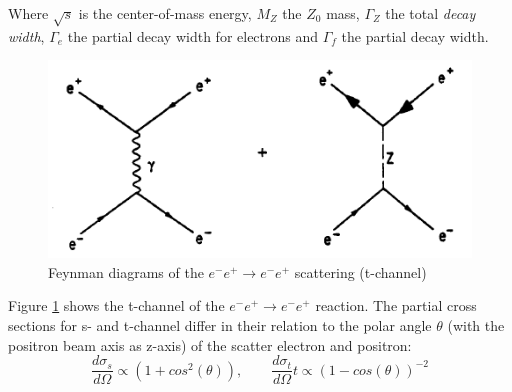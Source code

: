 Where $\sqrt{s}$ is the center-of-mass energy, $M_Z$ the $Z_0$ mass, $\Gamma_Z$ the total \emph{decay width}, $\Gamma_e$ the partial decay width for electrons and $\Gamma_f$ the partial decay width.
\begin{figure}[H]
	\centering
	\includegraphics{graphics/BhabbaStreuung.png}
	\caption[Feynman diagram: Bhabha scattering]{Feynman diagrams of the $e^-e^+ \rightarrow e^-e^+$ scattering (t-channel)\cite{muenchen}}
	\label{fig:principles:BhabbaStreuung.png}
\end{figure}
Figure \ref{fig:principles:BhabbaStreuung.png} shows the t-channel of the  $e^-e^+ \rightarrow e^-e^+$ reaction. The partial cross sections for s- and t-channel differ in their relation to the polar angle $\theta$ (with the positron beam axis as z-axis) of the scatter electron and positron\cite{staatsex}:
\begin{equation}
\frac{d\sigma_s}{d\Omega} \propto (1+cos^2(\theta)),\qquad\frac{d\sigma_t}{d\Omega}t \propto (1-cos(\theta))^{-2}
\label{eq:principles:s-t-channel}
\end{equation}
